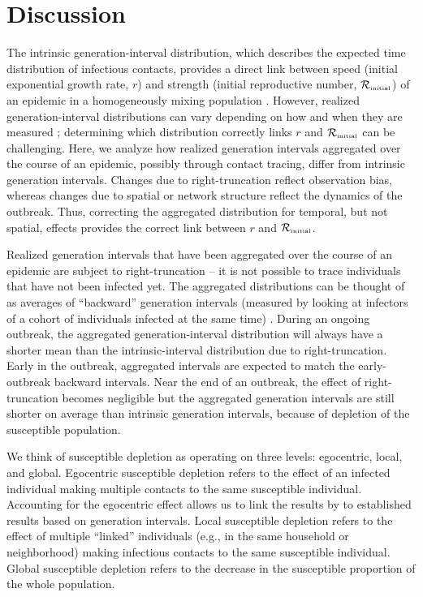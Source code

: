 \documentclass[12pt]{article}
\newcommand{\Rx}[1]{\ensuremath{{\mathcal R}_{#1}}\xspace}
\newcommand{\Rini}{\Rx{\textrm{\tiny initial}}}
\begin{document}
\section{Discussion}

The intrinsic generation-interval distribution, which describes the expected time distribution of infectious contacts, provides a direct link between speed (initial exponential growth rate, $r$) and strength (initial reproductive number, $\Rini$) of an epidemic in a homogeneously mixing population \citep{wallinga2007generation, svensson2007note, svensson2015influence, park2019practical}.
However, realized generation-interval distributions can vary depending on how and when they are measured \citep{nishiura2010time, tomba2010some, champredon2015intrinsic, britton2019estimation};
determining which distribution correctly links $r$ and $\Rini$ can be challenging.
Here, we analyze how realized generation intervals aggregated over the course of an epidemic, possibly through contact tracing, differ from intrinsic generation intervals.
Changes due to right-truncation reflect observation bias, whereas changes due to spatial or network structure reflect the dynamics of the outbreak.
Thus, correcting the aggregated distribution for temporal, but not spatial, effects provides the correct link between $r$ and $\Rini$.

Realized generation intervals that have been aggregated over the course of an epidemic are subject to right-truncation -- it is not possible to trace individuals that have not been infected yet.
The aggregated distributions can be thought of as averages of ``backward'' generation intervals (measured by looking at infectors of a cohort of individuals infected at the same time) \citep{champredon2015intrinsic, kenah2008generation, nishiura2010time, tomba2010some, britton2019estimation}.
During an ongoing outbreak, the aggregated generation-interval distribution will always have a shorter mean than the intrinsic-interval distribution due to right-truncation.
Early in the outbreak, aggregated intervals are expected to match the early-outbreak backward intervals.
Near the end of an outbreak, the effect of right-truncation becomes negligible but the aggregated generation intervals are still shorter on average than intrinsic generation intervals, because of depletion of the susceptible population.

We think of susceptible depletion as operating on three levels: egocentric, local, and global.
Egocentric susceptible depletion refers to the effect of an infected individual making multiple contacts to the same susceptible individual.
Accounting for the egocentric effect allows us to link the results by \cite{trapman2016inferring} to established results based on generation intervals.
Local susceptible depletion refers to the effect of multiple ``linked'' individuals (e.g., in the same household or neighborhood) making infectious contacts to the same susceptible individual.
Global susceptible depletion refers to the decrease in the susceptible proportion of the whole population.
\end{document}
